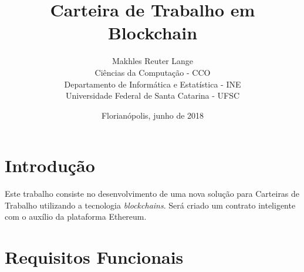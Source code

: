 \documentclass[a4paper,10pt]{article}
\author{Makhles Reuter Lange \\
        Ciências da Computação - CCO \\
        Departamento de Informática e Estatística - INE \\
        Universidade Federal de Santa Catarina - UFSC}
\title{Carteira de Trabalho em Blockchain}
\date{Florianópolis, junho de 2018}
\begin{document}
\maketitle

\section{Introdução}

Este trabalho consiste no desenvolvimento de uma nova solução para Carteiras de Trabalho utilizando a tecnologia \emph{blockchains}. Será criado um contrato inteligente com o auxílio da plataforma Ethereum.


\section{Requisitos Funcionais}
\end{document}
